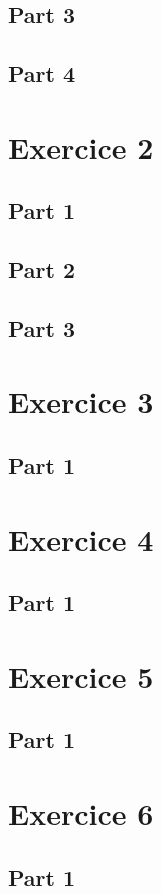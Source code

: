 \documentclass{article}
\begin{document}
\subsection{Part 3}
\subsection{Part 4}


\section{Exercice 2}
\subsection{Part 1}
\subsection{Part 2}
\subsection{Part 3}


\section{Exercice 3}
\subsection{Part 1}


\section{Exercice 4}
\subsection{Part 1}


\section{Exercice 5}
\subsection{Part 1}


\section{Exercice 6}
\subsection{Part 1}
\end{document}
